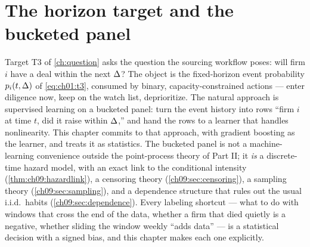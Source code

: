 
\section{The horizon target and the bucketed panel}\label{ch09:sec:panel}

Target T3 of \cref{ch:question} asks the question the sourcing workflow
poses: will firm $i$ have a deal within the next $\Delta$? The object
is the fixed-horizon event probability $p_i(t,\Delta)$ of
\cref{eq:ch01:t3}, consumed by binary, capacity-constrained actions ---
enter diligence now, keep on the watch list, deprioritize. The natural
approach is supervised learning on a bucketed panel: turn the event
history into rows ``firm $i$ at time $t$, did it raise within
$\Delta$,'' and hand the rows to a learner that handles nonlinearity.
This chapter commits to that approach, with gradient boosting as the
learner, and treats it as statistics. The bucketed panel is not a
machine-learning convenience outside the point-process theory of Part
II; it \emph{is} a discrete-time hazard model, with an exact link to the
conditional intensity (\cref{thm:ch09:hazardlink}), a censoring theory
(\cref{ch09:sec:censoring}), a sampling theory
(\cref{ch09:sec:sampling}), and a dependence structure that rules out
the usual i.i.d.\ habits (\cref{ch09:sec:dependence}). Every labeling
shortcut --- what to do with windows that cross the end of the data,
whether a firm that died quietly is a negative, whether sliding the
window weekly ``adds data'' --- is a statistical decision with a signed
bias, and this chapter makes each one explicitly.

